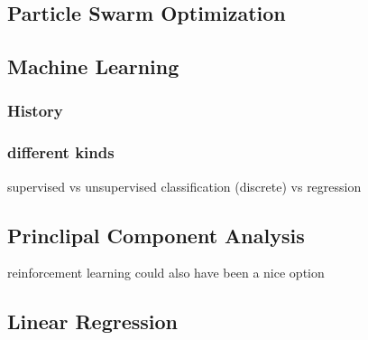 \subsection{Particle Swarm Optimization}
\subsection{Machine Learning}
\subsubsection{History}
\subsubsection{different kinds} 
supervised vs unsupervised
classification (discrete) vs regression
\subsection{Princlipal Component Analysis}
reinforcement learning could also have been a nice option
\subsection{Linear Regression}
